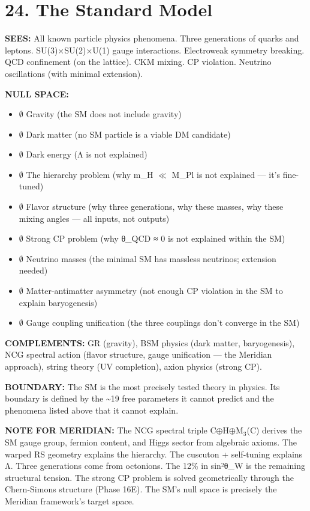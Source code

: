 \bigskip\noindent\makebox[\textwidth]{\color{rulegray}\rule{5cm}{0.3pt}}\bigskip


\section*{24. The Standard Model}


\textbf{SEES:} All known particle physics phenomena. Three generations of quarks and leptons. SU(3)×SU(2)×U(1) gauge interactions. Electroweak symmetry breaking. QCD confinement (on the lattice). CKM mixing. CP violation. Neutrino oscillations (with minimal extension).


\textbf{NULL SPACE:}

\begin{itemize}[nosep,leftmargin=*]
  \item $\emptyset$ Gravity (the SM does not include gravity)
  \item $\emptyset$ Dark matter (no SM particle is a viable DM candidate)
  \item $\emptyset$ Dark energy (Λ is not explained)
  \item $\emptyset$ The hierarchy problem (why m\_H $\ll$ M\_Pl is not explained — it's fine-tuned)
  \item $\emptyset$ Flavor structure (why three generations, why these masses, why these mixing angles — all inputs, not outputs)
  \item $\emptyset$ Strong CP problem (why θ\_QCD ≈ 0 is not explained within the SM)
  \item $\emptyset$ Neutrino masses (the minimal SM has massless neutrinos; extension needed)
  \item $\emptyset$ Matter-antimatter asymmetry (not enough CP violation in the SM to explain baryogenesis)
  \item $\emptyset$ Gauge coupling unification (the three couplings don't converge in the SM)
\end{itemize}


\textbf{COMPLEMENTS:} GR (gravity), BSM physics (dark matter, baryogenesis), NCG spectral action (flavor structure, gauge unification — the Meridian approach), string theory (UV completion), axion physics (strong CP).


\textbf{BOUNDARY:} The SM is the most precisely tested theory in physics. Its boundary is defined by the \textasciitilde{}19 free parameters it cannot predict and the phenomena listed above that it cannot explain.


\textbf{NOTE FOR MERIDIAN:} The NCG spectral triple C$\oplus$H$\oplus$M$_3$(C) derives the SM gauge group, fermion content, and Higgs sector from algebraic axioms. The warped RS geometry explains the hierarchy. The cuscuton + self-tuning explains Λ. Three generations come from octonions. The 12\% in sin²θ\_W is the remaining structural tension. The strong CP problem is solved geometrically through the Chern-Simons structure (Phase 16E). The SM's null space is precisely the Meridian framework's target space.


